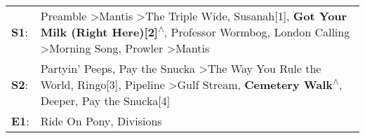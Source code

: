 \begin{supertabular}{p{0.03\textwidth}p{0.92\textwidth}}
 \textbf{S1}:  &  Preamble\textsuperscript{} \textgreater \enspace Mantis\textsuperscript{} \textgreater \enspace The Triple Wide\textsuperscript{}, \enspace Susanah[1]\textsuperscript{}, \enspace \textbf{Got Your Milk (Right Here)[2]\textsuperscript{$\wedge$}}, \enspace Professor Wormbog\textsuperscript{}, \enspace London Calling\textsuperscript{} \textgreater \enspace Morning Song\textsuperscript{}, \enspace Prowler\textsuperscript{} \textgreater \enspace Mantis\textsuperscript{}  \enspace  \\
 \textbf{S2}:  &                                                              Partyin' Peeps\textsuperscript{}, \enspace Pay the Snucka\textsuperscript{} \textgreater \enspace The Way You Rule the World\textsuperscript{}, \enspace Ringo[3]\textsuperscript{}, \enspace Pipeline\textsuperscript{} \textgreater \enspace Gulf Stream\textsuperscript{}, \enspace \textbf{Cemetery Walk\textsuperscript{$\wedge$}}, \enspace Deeper\textsuperscript{}, \enspace Pay the Snucka[4]\textsuperscript{}  \enspace  \\
 \textbf{E1}:  &                                                                                                                                                                                                                                                                                                                                                                                                                  Ride On Pony\textsuperscript{}, \enspace Divisions\textsuperscript{}  \enspace  \\
\end{supertabular}
